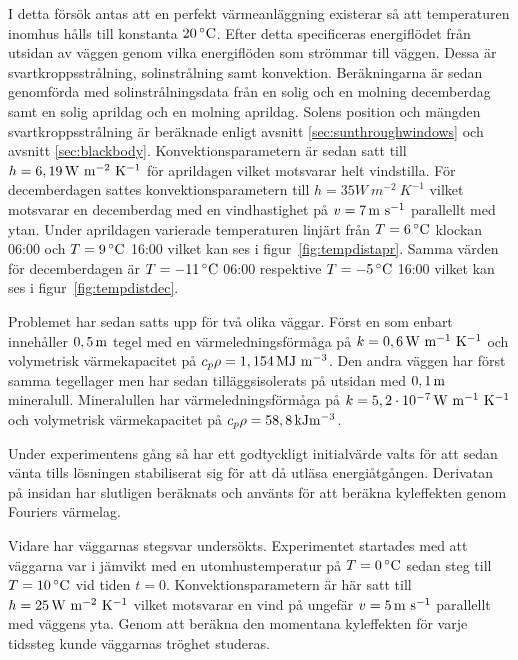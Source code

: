 I detta försök antas att en perfekt värmeanläggning
existerar så att temperaturen inomhus hålls till konstanta $\unit[20]{^\circ C}$. Efter detta specificeras energiflödet
från utsidan av väggen genom vilka energiflöden som strömmar till väggen. Dessa är svartkroppsstrålning, solinstrålning
samt konvektion. Beräkningarna är sedan genomförda med solinstrålningsdata från en solig och en molning decemberdag samt
en solig aprildag och en molning aprildag. Solens position och mängden svartkroppsstrålning är beräknade enligt avsnitt
\ref{sec:sunthroughwindows} och avsnitt \ref{sec:blackbody}.
Konvektionsparametern är sedan satt till $h=\unit[6,19]{W~m^{-2}~K^{-1}}$ för aprildagen vilket motsvarar helt vindstilla.
För decemberdagen sattes konvektionsparametern till $h=\unit{35}{W~m^{-2}~K^{-1}}$ vilket motsvarar en decemberdag med en vindhastighet på $v=\unit[7]{m~s^{-1}}$ parallellt
med ytan.
Under aprildagen varierade temperaturen linjärt från $T=\unit[6]{^\circ C}$ klockan 06:00 och $T=\unit[9]{^\circ C}$ 16:00 vilket kan ses i figur~\ref{fig:tempdistapr}.
Samma värden för decemberdagen är $T = \unit[-11]{^\circ C}$ 06:00 respektive $T=\unit[-5]{^\circ C}$ 16:00 vilket kan ses i figur~\ref{fig:tempdistdec}.

Problemet har sedan satts upp för två olika väggar. Först en som enbart innehåller $\unit[0,5]{m}$ tegel med
en värmeledningsförmåga på $k = \unit[0,6]{W~m^{-1}~K^{-1}}$ och volymetrisk värmekapacitet på
$c_{p}\rho = \unit[1,154]{MJ~m^{-3}}$. Den andra väggen har först samma tegellager men
har sedan tilläggsisolerats på utsidan med $\unit[0,1]{m}$ mineralull. Mineralullen har värmeledningsförmåga på
$k = \unit[5,2\cdot 10^{-7}]{W~m^{-1}~K^{-1}}$ och volymetrisk värmekapacitet på
$c_{p}\rho = \unit[58,8]{kJ m^{-3}}$. \cite{kandidatarbete2010}\cite{engineeringtoolboxdensity}\cite{bkvthermal}\cite{engineeringtoolboxspecificheat}

Under experimentens gång så har ett godtyckligt initialvärde valts för att sedan vänta tills
lösningen stabiliserat sig för att då utläsa energiåtgången. Derivatan på insidan har slutligen beräknats
och använts för att beräkna kyleffekten genom Fouriers värmelag.

Vidare har väggarnas stegsvar undersökts. Experimentet startades med att väggarna var i jämvikt med en utomhustemperatur på $T = \unit[0]{^\circ C}$ sedan steg till $T = \unit[10]{^\circ C}$ vid tiden $t=0$. Konvektionsparametern är här satt till
$h = \unit[25]{W~m^{-2}~K^{-1}}$ vilket motsvarar en vind på ungefär 
$v = \unit[5]{m~s^{-1}}$ parallellt med väggens yta. Genom att beräkna den momentana kyleffekten för varje tidssteg kunde väggarnas tröghet studeras.


